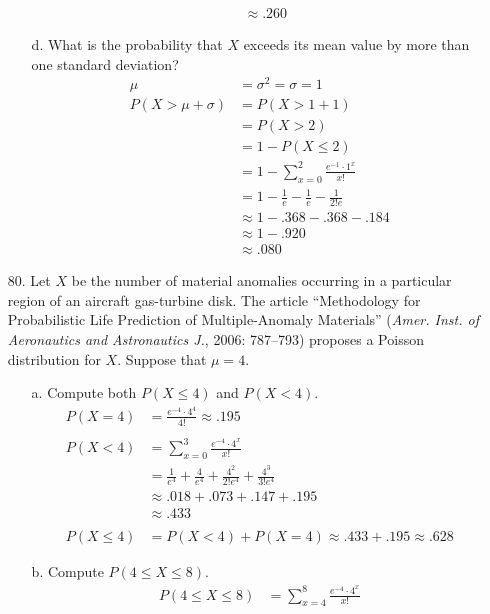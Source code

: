 \documentclass[letterpaper,12pt]{article}
\newcommand{\poisson}[2]{%
  \frac{e^{-#2} \cdot #2^{#1}}{#1!}%
}
\newcommand{\poissonsum}[3]{%
  \sum_{x = #1}^{#2} \poisson{x}{#3}%
}
\begin{document}
\begin{enumerate}
\begin{enumerate}
\begin{align*}
          &\approx .260
        \end{align*}
      \item[d.]
        What is the probability that $X$ exceeds its mean value by more than one standard deviation?
        \begin{align*}
          \mu &= \sigma^2 = \sigma = 1 \\
          P(X > \mu + \sigma) &= P(X > 1 + 1) \\
          &= P(X > 2) \\
          &= 1 - P(X \le 2) \\
          &= 1 - \poissonsum{0}{2}{1} \\
          &= 1 - \frac{1}{e} - \frac{1}{e} - \frac{1}{2!e} \\
          &\approx 1 - .368 - .368 - .184 \\
          &\approx 1 - .920 \\
          &\approx .080
        \end{align*}
    \end{enumerate}
  \item[80.]
    Let $X$ be the number of material anomalies occurring in a particular region of an aircraft gas-turbine disk. The article ``Methodology for Probabilistic Life Prediction of Multiple-Anomaly Materials'' (\textit{Amer. Inst. of Aeronautics and Astronautics J.}, 2006: 787–793) proposes a Poisson distribution for $X$. Suppose that $\mu = 4$.
    \begin{enumerate}
      \item[a.]
        Compute both $P(X \le 4)$ and $P(X < 4)$.
        \begin{align*}
          P(X = 4) &= \poisson{4}{4} \approx .195 \\
          \\
          P(X < 4) &= \poissonsum{0}{3}{4} \\
          &= \frac{1}{e^4} + \frac{4}{e^4} + \frac{4^2}{2!e^4} + \frac{4^3}{3!e^4} \\
          &\approx .018 + .073 + .147 + .195 \\
          &\approx .433 \\
          \\
          P(X \le 4) &= P(X < 4) + P(X = 4) \approx .433 + .195 \approx .628
        \end{align*}
      \item[b.]
        Compute $P(4 \le X \le 8)$.
        \begin{align*}
          P(4 \le X \le 8) &= \poissonsum{4}{8}{4} \\

\end{align*}
\end{enumerate}
\end{enumerate}
\end{document}
